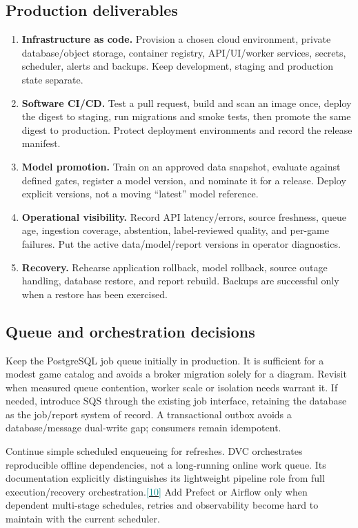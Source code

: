 \documentclass[10pt,letterpaper]{article}
\newcommand{\sr}[1]{\hyperlink{src#1}{\textcolor{teal}{[#1]}}}
\newcommand{\key}[1]{\textbf{\color{ink}#1}}
\begin{document}
\subsection{Production deliverables}
\begin{enumerate}
\item \key{Infrastructure as code.} Provision a chosen cloud environment, private database/object storage, container registry, API/UI/worker services, secrets, scheduler, alerts and backups. Keep development, staging and production state separate.
\item \key{Software CI/CD.} Test a pull request, build and scan an image once, deploy the digest to staging, run migrations and smoke tests, then promote the same digest to production. Protect deployment environments and record the release manifest.
\item \key{Model promotion.} Train on an approved data snapshot, evaluate against defined gates, register a model version, and nominate it for a release. Deploy explicit versions, not a moving ``latest'' model reference.
\item \key{Operational visibility.} Record API latency/errors, source freshness, queue age, ingestion coverage, abstention, label-reviewed quality, and per-game failures. Put the active data/model/report versions in operator diagnostics.
\item \key{Recovery.} Rehearse application rollback, model rollback, source outage handling, database restore, and report rebuild. Backups are successful only when a restore has been exercised.
\end{enumerate}

\subsection{Queue and orchestration decisions}
Keep the PostgreSQL job queue initially in production. It is sufficient for a modest game catalog and avoids a broker migration solely for a diagram. Revisit when measured queue contention, worker scale or isolation needs warrant it. If needed, introduce SQS through the existing job interface, retaining the database as the job/report system of record. A transactional outbox avoids a database/message dual-write gap; consumers remain idempotent.

Continue simple scheduled enqueueing for refreshes. DVC orchestrates reproducible offline dependencies, not a long-running online work queue. Its documentation explicitly distinguishes its lightweight pipeline role from full execution/recovery orchestration.\sr{10} Add Prefect or Airflow only when dependent multi-stage schedules, retries and observability become hard to maintain with the current scheduler.
\end{document}
